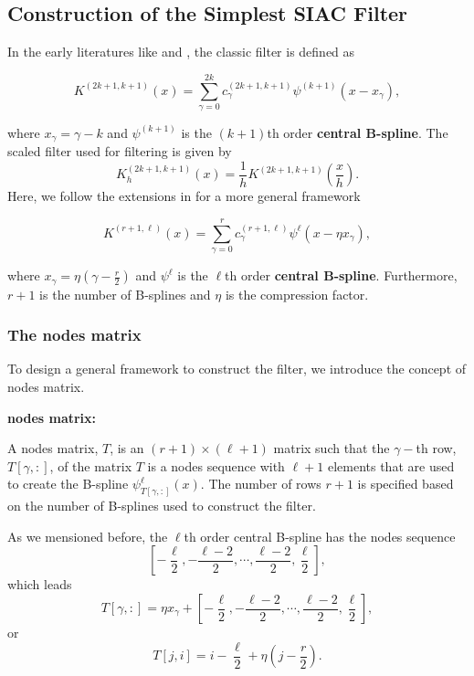 \documentclass[11pt]{article}
\begin{document}
    \subsection{Construction of the Simplest SIAC
Filter}\label{construction-of-the-simplest-siac-filter}

In the early literatures like \cite{Bramble:1977} and
\cite{Cockburn:2003}, the classic filter is defined as

\begin{equation}
    K^{(2k+1,k+1)}(x) = \sum\limits_{\gamma=0}^{2k}c^{(2k+1,k+1)}_{\gamma}\psi^{(k+1)}\left(x - x_\gamma\right),
\end{equation}

where \(x_\gamma = \gamma - k\) and \(\psi^{(k+1)}\) is the \((k+1)\)th
order \textbf{central B-spline}. The scaled filter used for filtering is
given by
\[ K_h^{(2k+1,k+1)}(x) = \frac{1}{h}K^{(2k+1,k+1)}\left(\frac{x}{h}\right). \]
Here, we follow the extensions in \cite{Li:2015} for a more general
framework

\begin{equation}
    K^{(r+1,\ell)}(x) = \sum\limits_{\gamma=0}^{r}c^{(r+1,\ell)}_{\gamma}\psi^{\ell}\left(x - \eta x_\gamma\right),
\end{equation}

where \(x_\gamma = \eta\left(\gamma - \frac{r}{2}\right)\) and
\(\psi^{\ell}\) is the \(\ell\)th order \textbf{central B-spline}.
Furthermore, \(r+1\) is the number of B-splines and \(\eta\) is the
compression factor.

    \subsubsection{The nodes matrix}\label{the-nodes-matrix}

To design a general framework to construct the filter, we introduce the
concept of nodes matrix.

\textbf{nodes matrix:}

A nodes matrix, \(T\), is an \((r+1) \times (\ell+1)\) matrix such that
the \(\gamma-\)th row, \(T[\gamma,:]\), of the matrix \(T\) is a nodes
sequence with \(\ell+1\) elements that are used to create the B-spline
\(\psi_{T[\gamma,:]}^{\ell}(x)\). The number of rows \(r+1\) is
specified based on the number of B-splines used to construct the filter.

As we mensioned before, the \(\ell\)th order central B-spline has the
nodes sequence
\[\left[-\frac{\ell}{2},-\frac{\ell-2}{2},\cdots,\frac{\ell-2}{2},\frac{\ell}{2}\right],\]
which leads
\[T[\gamma,:] = \eta x_\gamma + \left[-\frac{\ell}{2},-\frac{\ell-2}{2},\cdots,\frac{\ell-2}{2},\frac{\ell}{2}\right],\]
or \[T[j, i] = i - \frac{\ell}{2} + \eta \left(j - \frac{r}{2}\right).\]
\end{document}
